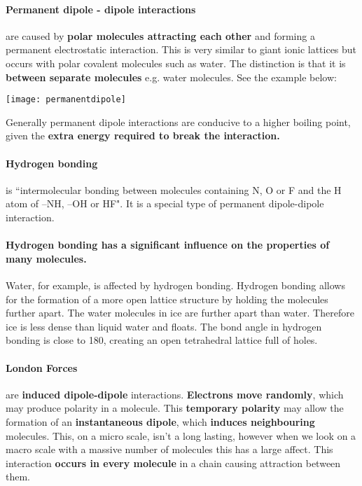 	\paragraph{Permanent dipole - dipole interactions} are caused by\textbf{ polar molecules attracting each other} and forming a permanent electrostatic interaction.
	This is very similar to giant ionic lattices but occurs with polar covalent molecules such as water.
	The distinction is that it is \textbf{between separate molecules} e.g. water molecules. See the example below:
    \begin{center}
\texttt{[image: permanentdipole]}
\end{center}
	
	Generally permanent dipole interactions are conducive to a higher boiling point, given the \textbf{extra energy required to break the interaction.}
	
	\paragraph{Hydrogen bonding} is ``intermolecular bonding between molecules containing N, O or F and the H atom of –NH, –OH or HF". It is a special type of permanent dipole-dipole interaction. 
	
	\paragraph{Hydrogen bonding has a significant influence on the properties of many molecules.}
	Water, for example, is affected by hydrogen bonding.
	Hydrogen bonding allows for the formation of a more open lattice structure by holding the molecules further apart. The water molecules in ice are further apart than water. Therefore ice is less dense than liquid water and floats. The bond angle in hydrogen bonding is close to 180\degree , creating an open tetrahedral lattice full of holes.
	
	\paragraph{London Forces} are \textbf{induced dipole-dipole} interactions.
	\textbf{Electrons move randomly}, which may produce polarity in a molecule.
	This \textbf{temporary polarity} may allow the formation of an \textbf{instantaneous dipole}, which\textbf{ induces neighbouring} molecules. 
	This, on a micro scale, isn't a long lasting, however when we look on a macro scale with a massive number of molecules this has a large affect.
	This interaction \textbf{occurs in every molecule} in a chain causing attraction between them.
	
